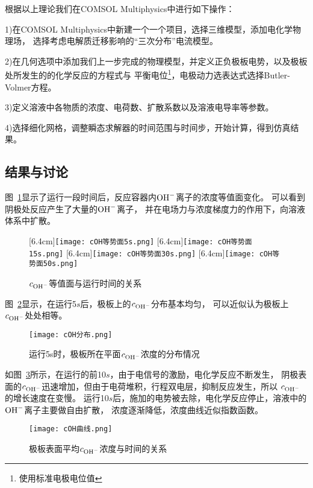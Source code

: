 根据以上理论我们在COMSOL Multiphysics中进行如下操作：

1)在COMSOL Multiphysics中新建一个一个项目，选择三维模型，添加电化学物理场，
选择考虑电解质迁移影响的“三次分布”电流模型。

2)在几何选项中添加我们上一步完成的物理模型，并定义正负极板电势，以及极板处所发生的的化学反应的方程式与
平衡电位\footnote{使用标准电极电位值}，电极动力选表达式选择Butler-Volmer方程。

3)定义溶液中各物质的浓度、电荷数、扩散系数以及溶液电导率等参数。

4)选择细化网格，调整瞬态求解器的时间范围与时间步，开始计算，得到仿真结果。

\subsection{结果与讨论}
图~\ref{fig:cOH1}显示了运行一段时间后，反应容器内$\ce{OH-}$离子的浓度等值面变化。
可以看到阴极处反应产生了大量的$\ce{OH-}$离子，
并在电场力与浓度梯度力的作用下，向溶液体系中扩散。
\begin{figure}[ht]
    \centering
                    [6.4cm]{\texttt{[image: cOH等势面5s.png]}}
    \hspace{1cm}
                    [6.4cm]{\texttt{[image: cOH等势面15s.png]}}
    \centering
                    [6.4cm]{\texttt{[image: cOH等势面30s.png]}}
    \hspace{1cm}
                    [6.4cm]{\texttt{[image: cOH等势面50s.png]}}
    \caption{$c_{\ce{OH-}}$等值面与运行时间的关系}
    \label{fig:cOH1}
\end{figure}

图~\ref{fig:cOH_distribution}显示，在运行5$s$后，极板上的$c_{\ce{OH-}}$分布基本均匀，
可以近似认为极板上$c_{\ce{OH-}}$处处相等。
\begin{figure}[H]
    \centering
    \texttt{[image: cOH分布.png]}
    \caption{运行5s时，极板所在平面$c_{\ce{OH-}}$浓度的分布情况}
    \label{fig:cOH_distribution}
\end{figure}

如图~\ref{fig:cOH_t}所示，在运行的前10$s$，由于电信号的激励，电化学反应不断发生，
阴极表面的$c_{\ce{OH-}}$迅速增加，但由于电荷堆积，行程双电层，抑制反应发生，所以
$c_{\ce{OH-}}$的增长速度在变慢。
运行10$s$后，施加的电势被去除，电化学反应停止，溶液中的${\ce{OH-}}$离子主要做自由扩散，
浓度逐渐降低，浓度曲线近似指数函数。
\begin{figure}[H]
    \centering
    \texttt{[image: cOH曲线.png]}
    \caption{极板表面平均$c_{\ce{OH-}}$浓度与时间的关系}
    \label{fig:cOH_t}
\end{figure}

